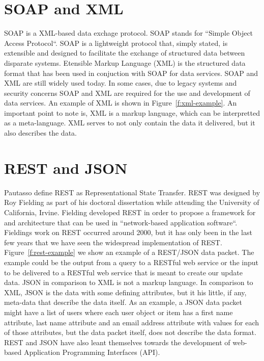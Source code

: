 \section{SOAP and XML}
SOAP is a XML-based data exchage protocol\cite{Quaine2007}.  SOAP stands for
``Simple Object Access Protocol``\cite{Microsoft2018}.  SOAP is a lightweight
protocol that, simply stated, is extensible and designed to facilitate the
exchange of structured data between disparate systems\cite{Microsoft2018}.
Etensible Markup Language (XML) is the structured data format that has been
used in conjuction with SOAP for data services\cite{Walsh1998}.  SOAP and XML
are still widely used today.  In some cases, due to legacy systems and security
concerns SOAP and XML are required for the use and development of data services.
An example of XML is shown in Figure~\ref{f:xml-example}\cite{WikipidiaXML1028}.
An important point to note is, XML is a markup language, which can be
interpretted as a meta-language.  XML serves to not only contain the data it
delivered, but it also describes the data\cite{Aihkisalo2012}.

\section{REST and JSON}
Pautasso\cite{Pautasso2008} define REST as Representational State
Transfer.  REST was designed by Roy Fielding as part of his doctoral
dissertation while attending the University of California, Irvine\cite{Fielding2000}.
Fielding developed REST in order to propose a framework for and architecture
that can be used in ``network-based application software``\cite{Fielding2000}.
Fieldings work on REST occurred around 2000, but it has only been in the last
few years that we have seen the widespread implementation of REST.
Figure~\ref{f:rest-example} we show an example of a REST/JSON data packet.  The
example could be the output from a query to a RESTful web service or the input
to be delivered to a RESTful web service that is meant to create our update data.
JSON in comparison to XML is not a markup language.  In comparison to XML, JSON
is the data with some defining attributes, but it his little, if any, meta-data
that describe the data itself.  As an example, a JSON data packet might have a
list of users where each user object or item has a first name attribute, last
name attribute and an email address attribute with values for each of those
attributes, but the data packet itself, does not describe the data format.  REST
and JSON have also leant themselves towards the development of web-based
Application Programming Interfaces (API).

